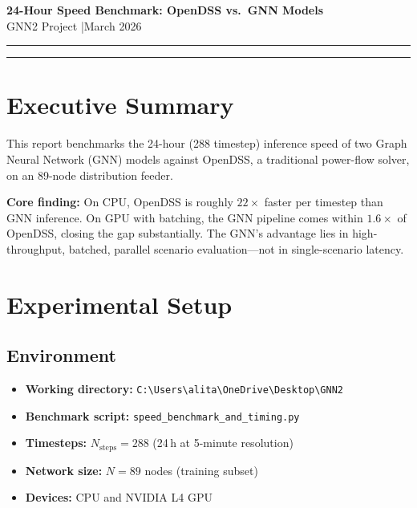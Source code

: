 \documentclass[11pt]{article}
\begin{document}
\begin{center}
  {\LARGE\bfseries\color{headerblue}
    24-Hour Speed Benchmark: OpenDSS vs.\ GNN Models}\\[6pt]
  {\large GNN2 Project \quad|\quad March 2026}
\end{center}

\vspace{4pt}
\noindent\textcolor{ruleblue}{\rule{\linewidth}{1.2pt}}
\vspace{10pt}

\tableofcontents
\vspace{14pt}
\noindent\textcolor{ruleblue}{\rule{\linewidth}{0.6pt}}
\vspace{10pt}

\section{Executive Summary}

This report benchmarks the 24-hour (288 timestep) inference speed of two Graph Neural
Network (GNN) models against OpenDSS, a traditional power-flow solver, on an 89-node
distribution feeder.

\medskip
\noindent\textbf{Core finding:} On CPU, OpenDSS is roughly $22\times$ faster per timestep
than GNN inference.  On GPU with batching, the GNN pipeline comes within $1.6\times$ of
OpenDSS, closing the gap substantially.  The GNN's advantage lies in high-throughput,
batched, parallel scenario evaluation---not in single-scenario latency.

\section{Experimental Setup}

\subsection{Environment}

\begin{itemize}
  \item \textbf{Working directory:} \verb|C:\Users\alita\OneDrive\Desktop\GNN2|
  \item \textbf{Benchmark script:} \verb|speed_benchmark_and_timing.py|
  \item \textbf{Timesteps:} $N_{\text{steps}} = 288$ \; (24\,h at 5-minute resolution)
  \item \textbf{Network size:} $N = 89$ nodes (training subset)
  \item \textbf{Devices:} CPU and NVIDIA L4 GPU
\end{itemize}
\end{document}
